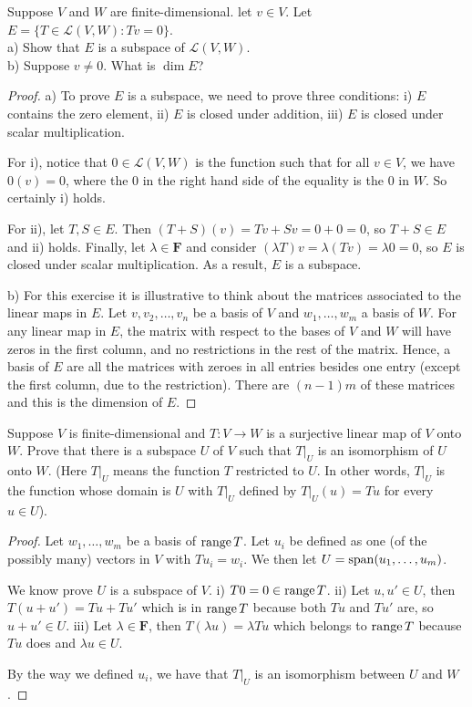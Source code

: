 \begin{exercise}{7}
  Suppose $V$ and $W$ are finite-dimensional. let $v\in V$. Let $E=\{T\in\mathcal{L}(V,W):Tv=0\}$.\\
  a) Show that $E$ is a subspace of $\mathcal{L}(V,W)$.\\
  b) Suppose $v\neq0$. What is $\dim E$?
\end{exercise}
\begin{proof}
 a) To prove $E$ is a subspace, we need to prove three conditions: i) $E$ contains the zero element, ii) $E$ is closed under addition, iii) $E$ is closed under scalar multiplication. 
 
 For i), notice that $0\in\mathcal{L}(V,W)$ is the function such that for all $v\in V$, we have $0(v)=0$, where the 0 in the right hand side of the equality is the 0 in $W$. So certainly i) holds. 
 
 For ii), let $T,S\in E$. Then $(T+S)(v)=Tv+Sv=0+0=0$, so $T+S\in E$ and ii) holds. Finally, let $\lambda\in\mathbf{F}$ and consider $(\lambda T)v=\lambda (Tv)=\lambda 0=0$, so $E$ is closed under scalar multiplication. As a result, $E$ is a subspace.
 
 b) For this exercise it is illustrative to think about the matrices associated to the linear maps in $E$. Let $v, v_{2},\dots,v_{n}$ be a basis of $V$ and $w_{1},\dots,w_{m}$ a basis of $W$. For any linear map in $E$, the matrix with respect to the bases of $V$ and $W$ will have zeros in the first column, and no restrictions in the rest of the matrix. Hence, a basis of $E$ are all the matrices with zeroes in all entries besides one entry (except the first column, due to the restriction). There are $(n-1)m$ of these matrices and this is the dimension of $E$.
\end{proof}


\begin{exercise}{8}
  Suppose $V$ is finite-dimensional and $T:V\rightarrow W$ is a surjective linear map of $V$ onto $W$. Prove that there is a subspace $U$ of $V$ such that $T\vert_{U}$ is an isomorphism of $U$ onto $W$. (Here $T\vert_{U}$ means the function $T$ restricted to $U$. In other words, $T\vert_{U}$ is the function whose domain is $U$ with $T\vert_{U}$ defined by $T\vert_{U}(u)=Tu$ for every $u\in U$).
\end{exercise}
\begin{proof}
 Let $w_{1},\dots,w_{m}$ be a basis of $\operatorname*{range} T$. Let $u_{i}$ be defined as one (of the possibly many) vectors in $V$ with $Tu_{i}=w_{i}$. We then let $U=\operatorname*{span}(u_{1},\dots,u_{m})$.
 
 We know prove $U$ is a subspace of $V$. i) $T0=0\in\operatorname*{range} T$. ii) Let $u,u'\in U$, then $T(u+u')=Tu+Tu'$ which is in $\operatorname*{range} T$ because both $Tu$ and $Tu'$ are, so $u+u'\in U$. iii) Let $\lambda\in\mathbf{F}$, then $T(\lambda u)=\lambda Tu$ which belongs to $\operatorname*{range} T$ because $Tu$ does and $\lambda u\in U$.
 
 By the way we defined $u_{i}$, we have that $T\vert_{U}$ is an isomorphism between $U$ and $W$.
\end{proof}


